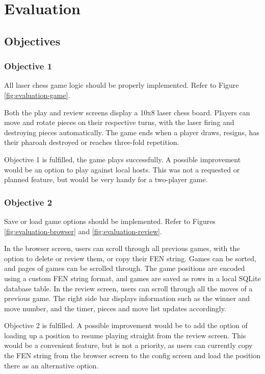 \documentclass[../main/main.tex]{subfiles}
\begin{document}
\newpage
\chapter{Evaluation}
\section{Objectives}
\subsection{Objective 1}
All laser chess game logic should be properly implemented. Refer to Figure \ref{fig:evaluation-game}.

Both the play and review screens display a 10x8 laser chess board. Players can move and rotate pieces on their respective turns, with the laser firing and destroying pieces automatically. The game ends when a player draws, resigns, has their pharoah destroyed or reaches three-fold repetition.

Objective 1 is fulfilled, the game plays successfully. A possible improvement would be an option to play against local hosts. This was not a requested or planned feature, but would be very handy for a two-player game.

\subsection{Objective 2}
Save or load game options should be implemented. Refer to Figures \ref{fig:evaluation-browser} and \ref{fig:evaluation-review}.

In the browser screen, users can scroll through all previous games, with the option to delete or review them, or copy their FEN string. Games can be sorted, and pages of games can be scrolled through. The game positions are encoded using a custom FEN string format, and games are saved as rows in a local SQLite database table. In the review screen, users can scroll through all the moves of a previous game. The right side bar displays information such as the winner and move number, and the timer, pieces and move list updates accordingly.

Objective 2 is fulfilled. A possible improvement would be to add the option of loading up a position to resume playing straight from the review screen. This would be a convenient feature, but is not a priority, as users can currently copy the FEN string from the browser screen to the config screen and load the position there as an alternative option.
\end{document}
